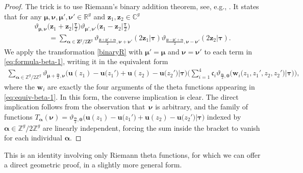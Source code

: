 \documentclass[pdftex]{sigma}
\numberwithin{equation}{section}
\newcommand{\Z}{\mathbf{Z}}
\begin{document}
\begin{proof}
The trick is to use Riemann's binary addition theorem, see, e.g., \cite[equation~(6.6)]{Tata1}. It states that for any $\bm{\mu},\bm{\nu},\bm{\mu}',\bm{\nu}' \in \mathbb{R}^g$ and $\bm{z}_1,\bm{z}_2 \in \mathbb{C}^g$
\begin{gather}
	 \vartheta_{\bm{\mu}, \bm{\nu}}\bigl(\bm{z}_{1} + \bm{z}_{2}\big| \tfrac{\bm{\tau}}{2}\bigr)\vartheta_{\bm{\mu}', \bm{\nu}'}\bigl(\bm{z}_{1} - \bm{z}_{2}\big| \tfrac{\bm{\tau}}{2}\bigr) \nonumber\\
\qquad{}	 = \sum_{\bm{\alpha} \in \Z^{g}/2\Z^{g}}\vartheta_{\frac{\bm{\mu}+\bm{\mu'}+\bm{\alpha}}{2} , \bm{\nu} + \bm{\nu}'} (2\bm{z}_{1} |\bm{\tau} )\vartheta_{\frac{\bm{\mu}-\bm{\mu}'+\bm{\alpha}}{2} , \bm{\nu} - \bm{\nu}'} (2\bm{z}_{2} |\bm{\tau} ).\label{binaryR}
\end{gather}
We apply the transformation \eqref{binaryR} with $\bm{\mu}' = \bm{\mu}$ and $\bm{\nu} = \bm{\nu}'$ to each term in \eqref{eq:formula-beta-1}, writing it in the equivalent form
\begin{gather*}
\sum_{\bm{\alpha} \in \mathbb{Z}^{g}/2\mathbb{Z}^{g}} \vartheta_{\bm{\mu} + \frac{\bm{\alpha}}{2},\bm{\nu}}\bigl(\bm{u}(z_1) - \bm{u}\bigl(z_1'\bigr) + \bm{u}(z_2) - \bm{u}\bigl(z_2'\bigr)\big|\bm{\tau}\bigr) \Biggl(\sum_{i = 1}^{4} \mathfrak{c}_i \vartheta_{\frac{\bm{\alpha}}{2},\bm{0}}\bigl(\bm{w}_i\bigl(z_1,z_1',z_2,z_2'\bigr)\big|\bm{\tau}\bigr)\Biggr),
\end{gather*}
where the $\bm{w}_{i}$ are exactly the four arguments of the theta functions appearing in \eqref{eq:equiv-beta-1}. In this form, the converse implication is clear. The direct implication follows from the observation that~$\bm{\nu}$ is arbitrary, and the family of functions $T_{\bm{\alpha}}(\bm{\nu}) = \vartheta_{\frac{\bm{\alpha}}{2},\bm{0}}\bigl(\bm{u}(z_1) - \bm{u}\bigl(z_1'\bigr) + \bm{u}(z_2) - \bm{u}\bigl(z_2'\bigr)\big|\bm{\tau}\bigr)$ indexed by $\bm{\alpha} \in \mathbb{Z}^{g}/2\mathbb{Z}^{g}$ are linearly independent, forcing the sum inside the bracket to vanish for each individual $\bm{\alpha}$.
\end{proof}


This is an identity involving only Riemann theta functions, for which we can offer a direct geometric proof, in a slightly more general form.
\end{document}
